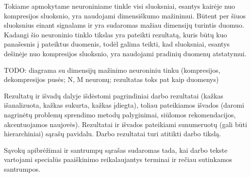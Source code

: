 \documentclass{VUMIFPSbakalaurinis}
\newcommand{\TODO}[1]{
\colorbox{todo-background-color}{TODO: #1}
}
\begin{document}
Tokiame apmokytame neuroniniame tinkle visi sluoksniai, esantys kairėje nuo kompresijos sluoksnio, yra naudojami dimensiškumo mažinimui.
Būtent per šiuos sluoksnius einant signalams ir yra sudaromas mažiau dimensijų turintis duomuo.
Kadangi šio neuroninio tinklo tikslas yra pateikti rezultatą, kuris būtų kuo panašesnis į pateiktus duomenis, todėl galima teikti, kad sluoksniai, esantys dešinėje nuo kompresijos sluoksnio, yra naudojami pradinių duomenų atstatymui.

\TODO{diagrama su dimensijų mažinimo neuroniniu tinku (kompresijos, dekompresijos pusės; N, M neuronų; rezultatas toks pat kaip duomenys)}



Rezultatų ir išvadų dalyje išdėstomi pagrindiniai darbo rezultatai (kažkas
išanalizuota, kažkas sukurta, kažkas įdiegta), toliau pateikiamos išvados
(daromi nagrinėtų problemų sprendimo metodų palyginimai, siūlomos
rekomendacijos, akcentuojamos naujovės). Rezultatai ir išvados pateikiami
sunumeruotų (gali būti hierarchiniai) sąrašų pavidalu. Darbo rezultatai turi
atitikti darbo tikslą.

\printbibliography[heading=bibintoc]  %

Sąvokų apibrėžimai ir santrumpų sąrašas sudaromas tada, kai darbo tekste
vartojami specialūs paaiškinimo reikalaujantys terminai ir rečiau sutinkamos
santrumpos.
\end{document}
